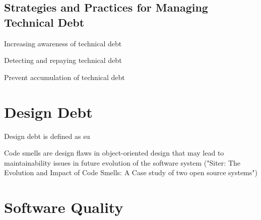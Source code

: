 \subsection{Strategies and Practices for Managing Technical Debt}

Increasing awareness of technical debt

Detecting and repaying technical debt

Prevent accumulation of technical debt

























\section{Design Debt}
Design debt is defined as su

Code smells are design flaws in object-oriented design that may lead to maintainability issues in future evolution of the software system ("Siter: The Evolution and Impact of Code Smells: A Case study of two open source systems")












\section{Software Quality}






